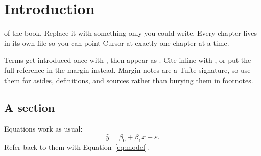 \chapter{Introduction}\label{ch:intro}

 of the book. Replace it with something
only you could write. Every chapter lives in its own file so you can point
Cursor at exactly one chapter at a time.

Terms get introduced once with , then appear as .
Cite inline with \autocite{tufte2001}, or put the full reference in the margin
instead. Margin notes are a Tufte signature, so use them for
asides, definitions, and sources rather than burying them in footnotes.

\section{A section}

Equations work as usual:
\begin{equation}
  \hat{y} = \beta_0 + \beta_1 x + \varepsilon.
  \label{eq:model}
\end{equation}
Refer back to them with Equation~\ref{eq:model}.


